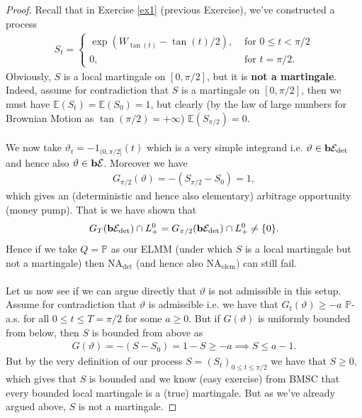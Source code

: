 \documentclass[12pt,a4paper, twoside]{article}
\theoremstyle{definition}
\newcommand{\EE}{\mathbb{E}} %
\newcommand{\PP}{\mathbb{P}} %
\newcommand{\simple}{\textbf{\text{b}}\mathcal{E}}
\newcommand{\verysimple}{\textbf{\text{b}}\mathcal{E}_{\text{det}}}
\begin{document}
\begin{proof}
Recall that in Exercise \ref{ex1} (previous Exercise), we've constructed a process
\begin{align*}
S_t = \begin{cases} \exp (W_{\tan (t)}- \tan (t)/2), & \text{ for } 0 \leq t < \pi/2 \\ 0, & \text{ for } t= \pi/2.  \end{cases}
\end{align*}
Obviously, $S$ is a local martingale on $[0, \pi/2]$, but it is \textbf{not a martingale}. Indeed, assume for contradiction that $S$ is a martingale on $[0, \pi/2]$, then we must have $\EE(S_t)=\EE(S_0)=1$, but clearly (by the law of large numbers for Brownian Motion as $\tan( \pi/2)= + \infty$) $\EE(S_{\pi/2})=0$.\\
\\
We now take $\vartheta_t = -1_{(0, \pi/2]}(t)$ which is a very simple integrand i.e. $\vartheta \in \verysimple$ and hence also $\vartheta \in \simple$. Moreover we have 
\begin{align*}
G_{ \pi/2}( \vartheta)= - ( S_{ \pi/2}- S_0)=1,
\end{align*}
which gives an (deterministic and hence also elementary) arbitrage opportunity (money pump). That is we have shown that
\begin{align*}
G_T( \verysimple) \cap L_+^0 =G_{\pi/2}(\verysimple) \cap L_+^0  \neq \{0\}.
\end{align*}
Hence if we take $Q=\PP$ as our ELMM (under which $S$ is a local martingale but not a martingale) then NA$_\text{det}$ (and hence also NA$_{\text{elem}})$ can still fail.\\
\\
Let us now see if we can argue directly that $\vartheta$ is not admissible in this setup. Assume for contradiction that $\vartheta$ is admissible i.e. we have that $G_t( \vartheta) \geq -a$ $\PP$-a.s. for all $0 \leq t \leq T= \pi/2$ for some $a \geq 0$. But if $G( \vartheta)$ is uniformly bounded from below, then $S$ is bounded from above as
\begin{align*}
G( \vartheta)=-(S-S_0)=1-S \geq -a \implies S \leq a-1.
\end{align*}
But by the very definition of our process $S=(S_t)_{0 \leq t \leq \pi/2}$ we have that $S \geq 0$, which gives that $S$ is bounded and we know (easy exercise) from BMSC that every bounded local martingale is a (true) martingale. But as we've already argued above, $S$ is not a martingale. 
\end{proof}
\end{document}
